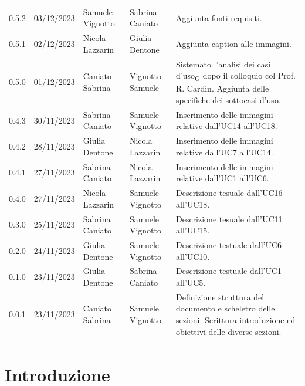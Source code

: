 \documentclass{article}
\begin{document}
\begin{center}
\begin{tabular}{P{4em} P{6em} P{7em} P{7em} P{11em}}
    \end{tabular}


\begin{tabular}{P{4em} P{6em} P{7em} P{7em} P{11em}} 
    0.5.2 & 03/12/2023 & Samuele Vignotto & Sabrina Caniato & Aggiunta fonti requisiti.\\
    0.5.1 & 02/12/2023 & Nicola Lazzarin & Giulia Dentone & Aggiunta caption alle immagini.\\ 
    0.5.0 & 01/12/2023 & Caniato Sabrina & Vignotto Samuele & Sistemato l'analisi dei casi d'uso\textsubscript{G} dopo il colloquio col Prof. R. Cardin. Aggiunta delle specifiche dei sottocasi d'uso.\\
    0.4.3 & 30/11/2023 & Sabrina Caniato & Samuele Vignotto & Inserimento delle immagini relative dall'UC14 all'UC18.\\
    0.4.2 & 28/11/2023 & Giulia Dentone & Nicola Lazzarin & Inserimento delle immagini relative dall'UC7 all'UC14.\\
    0.4.1 & 27/11/2023 & Sabrina Caniato & Nicola Lazzarin & Inserimento delle immagini relative dall'UC1 all'UC6.\\
    0.4.0 & 27/11/2023 & Nicola Lazzarin & Samuele Vignotto & Descrizione tesuale dall'UC16 all'UC18. \\
    0.3.0 & 25/11/2023 & Sabrina Caniato & Samuele Vignotto & Descrizione tesuale dall'UC11 all'UC15. \\
    0.2.0 & 24/11/2023 & Giulia Dentone & Samuele Vignotto & Descrizione testuale dall'UC6 all'UC10.\\ 
    0.1.0 & 23/11/2023 & Giulia Dentone & Sabrina Caniato & Descrizione testuale dall'UC1 all'UC5.\\
    0.0.1 & 23/11/2023 & Caniato Sabrina  & Samuele Vignotto & Definizione struttura del documento e scheletro delle sezioni. Scrittura introduzione ed obiettivi delle diverse sezioni.\\ 
\end{tabular}
\end{center}
\newpage
\tableofcontents
\listoffigures
\listoftables
\newpage
\section*{Introduzione}
\end{document}
